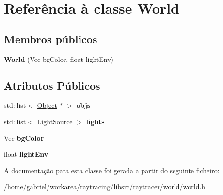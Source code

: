 \hypertarget{classWorld}{}\section{Referência à classe World}
\label{classWorld}
\subsection*{Membros públicos}
\begin{DoxyCompactItemize}
\item 
\mbox{\label{classWorld_a07fc4f8881889180e745a9843f331ffe}} 
{\bfseries World} (Vec bg\+Color, float light\+Env)
\end{DoxyCompactItemize}
\subsection*{Atributos Públicos}
\begin{DoxyCompactItemize}
\item 
\mbox{\label{classWorld_ab97841faf75338ea553d430cfc96a3e2}} 
std\+::list$<$ \hyperlink{classObject}{Object} $\ast$ $>$ {\bfseries objs}
\item 
\mbox{\label{classWorld_abbefbccb58aaffa5cfe77a73d03e27db}} 
std\+::list$<$ \hyperlink{classLightSource}{Light\+Source} $>$ {\bfseries lights}
\item 
\mbox{\label{classWorld_af8ca5773a58a6e7faee7beb824a1c5fc}} 
Vec {\bfseries bg\+Color}
\item 
\mbox{\label{classWorld_af618e742e01b9848f2355d027319cc74}} 
float {\bfseries light\+Env}
\end{DoxyCompactItemize}


A documentação para esta classe foi gerada a partir do seguinte ficheiro\+:\begin{DoxyCompactItemize}
\item 
/home/gabriel/workarea/raytracing/libsrc/raytracer/world/world.\+h\end{DoxyCompactItemize}
